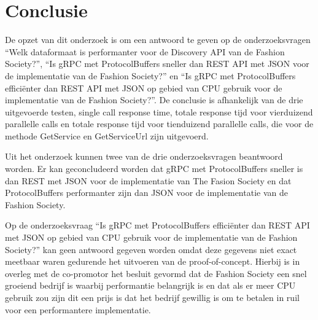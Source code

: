 
\chapter{Conclusie}
\label{ch:conclusie}


De opzet van dit onderzoek is om een antwoord te geven op de onderzoeksvragen “Welk dataformaat is performanter voor de Discovery API van de Fashion Society?”, “Is gRPC met ProtocolBuffers sneller dan REST API met JSON voor de implementatie van de Fashion Society?” en “Is gRPC met ProtocolBuffers efficiënter dan REST API met JSON op gebied van CPU gebruik voor de implementatie van de Fashion Society?”.
De conclusie is afhankelijk van de drie uitgevoerde testen, single call response time, totale response tijd voor vierduizend parallelle calls en totale response tijd voor tienduizend parallelle calls, die voor de methode GetService en GetServiceUrl zijn uitgevoerd.

Uit het onderzoek kunnen twee van de drie onderzoeksvragen beantwoord worden. Er kan geconcludeerd worden dat gRPC met ProtocolBuffers sneller is dan REST met JSON voor de implementatie van The Fasion Society en dat ProtocolBuffers performanter zijn dan JSON voor de implementatie van de Fashion Society.

Op de onderzoeksvraag “Is gRPC met ProtocolBuffers efficiënter dan REST API met JSON op gebied van CPU gebruik voor de implementatie van de Fashion Society?” kan geen antwoord gegeven worden omdat deze gegevens niet exact meetbaar waren gedurende het uitvoeren van de proof-of-concept. Hierbij is in overleg met de co-promotor het besluit gevormd dat de Fashion Society een snel groeiend bedrijf is waarbij performantie belangrijk is en dat als er meer CPU gebruik zou zijn dit een prijs is dat het bedrijf gewillig is om te betalen in ruil voor een performantere implementatie.





